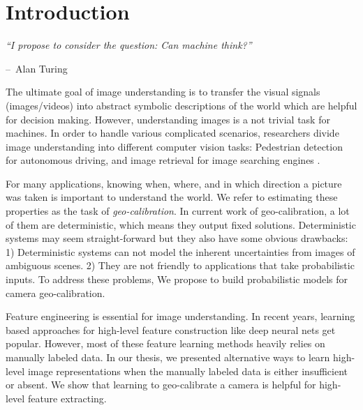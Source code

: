 \chapter{Introduction}
\label{chap:intro}

\makeatletter
\newenvironment{chapquote}[2][2em]
{\setlength{\@tempdima}{#1} \def\chapquote@author{#2} \parshape 1
  \@tempdima \dimexpr\textwidth-2\@tempdima\relax \itshape}
{\par\normalfont\hfill--\
\chapquote@author\hspace*{\@tempdima}\par\bigskip}
\makeatother

\begin{chapquote}{Alan Turing}
  ``I propose to consider the question: Can machine think?''
\end{chapquote}
The ultimate goal of image understanding is to transfer the visual
signals (images/videos) into abstract symbolic descriptions of the
world which are helpful for decision making.
However, understanding images is a not trivial task for machines.
In order to handle various complicated scenarios, researchers divide
image understanding into different computer vision tasks: Pedestrian
detection for autonomous driving, and image retrieval for image
searching engines \etc.

For many applications, knowing when, where, and in which direction a
picture was taken is important to understand the world. We refer to 
estimating these properties as the task of  {\em geo-calibration}.
In current work of geo-calibration, a lot of them are
deterministic, which means they output fixed solutions. Deterministic
systems may seem straight-forward but they also have some obvious
drawbacks: 1) Deterministic systems can not model the inherent
uncertainties from images of ambiguous scenes. 2) They are not
friendly to applications that take probabilistic inputs. To address
these problems, We propose to build probabilistic models for camera
geo-calibration.

Feature engineering is essential for image understanding. In recent
years, learning based approaches for high-level feature construction
like deep neural nets get popular. However, most of these feature
learning methods heavily relies on manually labeled data. In our
thesis, we presented alternative ways to learn high-level image
representations when the manually labeled data is either insufficient
or absent. We show that learning to geo-calibrate a camera is helpful
for high-level feature extracting.

